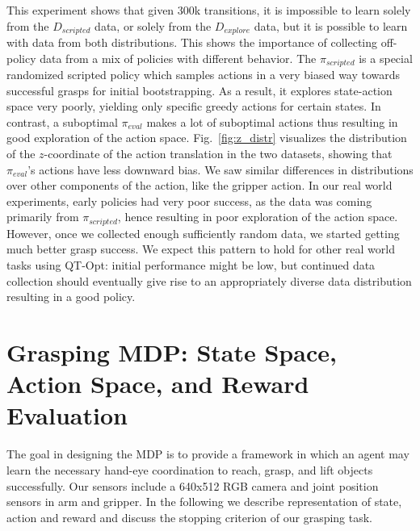 \documentclass{article}
\begin{document}
This experiment shows that given 300k transitions, it is impossible to learn solely from the \(D_{scripted}\) data, or solely from the \(D_{explore}\) data,
but it is possible to learn with data from both distributions. This shows the importance of collecting off-policy data from a mix of policies with different behavior. The \(\pi_{scripted}\) is a special randomized scripted policy which samples actions in a very biased way towards successful grasps for initial bootstrapping. As a result, it explores state-action space very poorly, yielding only specific greedy actions for certain states. In contrast, a suboptimal \(\pi_{eval}\) makes a lot of suboptimal actions thus resulting in good exploration of the action space. Fig.~\ref{fig:z_distr} visualizes the distribution of the $z$-coordinate of the action translation in the two datasets, showing that $\pi_{eval}$'s actions have less downward bias. We saw similar differences in distributions over other components of the action, like the gripper action. In our real world experiments, early policies had very poor success, as the data was coming primarily from \(\pi_{scripted}\), hence resulting in poor exploration of the action space. However, once we collected enough sufficiently random data, we started getting much better grasp success. We expect this pattern to hold for other real world tasks using QT-Opt: initial performance might be low, but continued data collection should eventually give rise to an appropriately diverse data distribution resulting in a good policy.

\section{Grasping MDP: State Space, Action Space, and Reward Evaluation}
\label{sec:appendix_state_action_reward}
The goal in designing the MDP is to provide a framework in which an agent may learn the necessary hand-eye coordination to reach, grasp, and lift objects successfully. Our sensors include a 640x512 RGB camera and joint position sensors in arm and gripper. In the following we describe representation of state, action and reward and discuss the stopping criterion of our grasping task.
\end{document}
